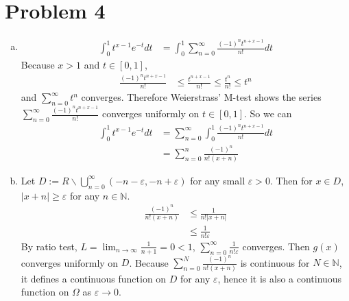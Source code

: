 \documentclass{report}
\def\ve{\varepsilon}
\def\abs#1{\left| #1 \right|}
\def\slash{\backslash{}}
\begin{document}
    \section*{Problem 4}
    \begin{enumerate}[(a)]
    
    \item
    \begin{align*}
        \int_0^1 t^{x-1} e^{-t} dt &= \int_0^1 \sum_{n=0}^\infty 
            \frac{{(-1)}^n t^{n+x-1}}{n!} dt
    \end{align*}
    Because $x > 1$ and $t \in [0, 1]$, 
    \begin{align*}
        \frac{{(-1)}^n t^{n+x-1}}{n!} &\le \frac{t^{n+x-1}}{n!} 
        \le \frac{t^{n}}{n!} \le t^{n}
    \end{align*}
    and $\sum_{n=0}^\infty t^{n}$ converges. Therefore Weierstrass' M-test shows the 
    series $\sum_{n=0}^\infty \frac{{(-1)}^n t^{n+x-1}}{n!}$ converges uniformly on 
    $t \in [0, 1]$. So we can 
    \begin{align*}
        \int_0^1 t^{x-1} e^{-t} dt &=  \sum_{n=0}^\infty 
            \int_0^1\frac{{(-1)}^n t^{n+x-1}}{n!} dt \\
            &= \sum_{n=0}^n \frac{{(-1)}^n}{n! (x+n)}
    \end{align*}

    \item
    Let $D := R \slash \bigcup_{n=0}^\infty(-n-\ve, -n+\ve)$ for any small $\ve > 0$.
    Then for $x \in D$, $\abs{x+n} \ge \ve$ for any $n \in \mathbb{N}$.
    \begin{align*}
        \frac{{(-1)}^n}{n! (x+n)} &\le \frac{1}{n!\abs{x+n}} \\
        &\le \frac{1}{n!\ve}
    \end{align*}
    By ratio test, $L = \lim_{n \to \infty} \frac{1}{n+1} = 0 < 1$, 
    $\sum_{n=0}^\infty\frac{1}{n!\ve}$ converges. Then $g(x)$ converges uniformly on $D$.
    Because $\sum_{n=0}^N \frac{{{(-1)}^n}}{n!(x+n)}$ is continuous for $N \in \mathbb{N}$, 
    it defines a continuous function on $D$ for any $\ve$, hence it is also a continuous 
    function on $\Omega$ as $\ve \to 0$.
    \end{enumerate}
\end{document}
